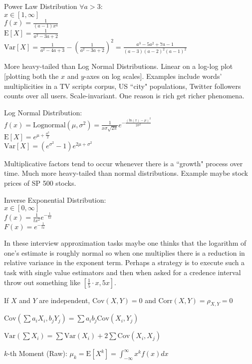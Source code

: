 Power Law Distribution $\forall a>3$: \\
$x \in [1,\infty]$ \\
$f(x) = \frac{1}{(a - 1)x^{a}}$ \\
$\text{E}[X] = \frac{1}{a^2-3a+2}$ \\
$\text{Var}[X] = \frac{1}{a^2-4a+3}-\left(\frac{1}{a^2-3a+2} \right)^2=\frac{a^3-5a^2+7a-1}{(a-3)(a-2)^2(a-1)^2}$

More heavy-tailed than Log Normal Distributions. Linear on a log-log plot [plotting both the $x$ and $y$-axes on log scales]. Examples include words' multiplicities in a TV scripts corpus, US ``city" populations, Twitter followers counts over all users. Scale-invariant. One reason is rich get richer phenomena.

Log Normal Distribution: \\
$f(x) = \text{Lognormal}(\mu,\sigma^2)=\frac{1}{x\sigma \sqrt{2 \pi}}e^{-\frac{(\text{ln}(x)-\mu)^2}{2 \sigma^2}}$ \\
$\text{E}[X] = e^{\mu + \frac{\sigma^2}{2}}$ \\
$\text{Var}[X] = (e^{\sigma^2}-1)e^{2 \mu+\sigma^2}$

Multiplicative factors tend to occur whenever there is a ``growth" process over time. Much more heavy-tailed than normal distributions. Example maybe stock prices of SP 500 stocks.

Inverse Exponential Distribution: \\
$x \in [0,\infty]$ \\
$f(x) = \frac{1}{tx^2} e^{-\frac{1}{tx}}$ \\
$F(x) = e^{-\frac{1}{tx}}$

In these interview approximation tasks maybe one thinks that the logarithm of one's estimate is roughly normal so when one multiplies there is a reduction in relative variance in the exponent term. Perhaps a strategy is to execute such a task with single value estimators and then when asked for a credence interval throw out something like $\left[\frac{1}{5} \cdot x, 5x \right]$.

If $X$ and $Y$ are independent, $\text{Cov}(X,Y)=0$ and $\text{Corr}(X,Y)=\rho_{X,Y}=0$

$\text{Cov}\left(\sum a_i X_i , b_j Y_j \right)=\sum a_i b_j \text{Cov}(X_i,Y_j)$

$\text{Var}\left(\sum X_i \right)=\sum \text{Var}(X_i) + 2 \sum \text{Cov}(X_i,X_j)$

$k$-th Moment (Raw): $\mu_k=\text{E}[X^k]=\int_{-\infty}^{\infty} x^k f(x) dx$

